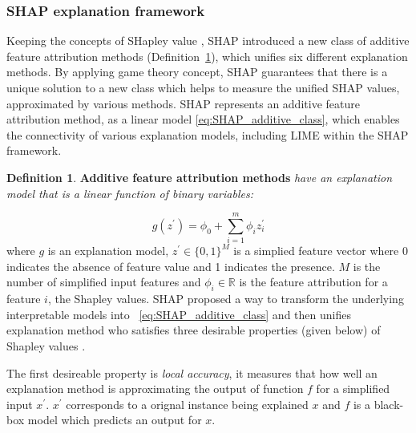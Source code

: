 \documentclass[english]{tktltiki2}
\theoremstyle{definition}
\newtheorem{definition}[thm]{Definition}
\theoremstyle{remark}
\begin{document}
\subsubsection{SHAP explanation framework} %
Keeping the concepts of SHapley value \citep{shapley1953value}, SHAP \citep{lundberg2017unified} introduced a new class of additive feature attribution methods (Definition~\ref{def:SHAP_additive_class}), which unifies six different explanation methods. By applying game theory concept, SHAP guarantees that there is a unique solution to a new class which helps to measure the unified SHAP values, approximated by various methods. SHAP represents an additive feature attribution method, as a linear model \eqref{eq:SHAP_additive_class}, which enables the connectivity of various explanation models, including LIME \citep{ribeiro2016should} within the SHAP framework.

\begin{definition}\label{def:SHAP_additive_class}{\textbf{Additive feature attribution methods} \textit{have an explanation model that is a linear
function of binary variables:}}
\end{definition}

\begin{equation}\label{eq:SHAP_additive_class}
	g(z^\prime) =  \phi_0 + \sum_{i=1}^{m} \phi_i z_i^\prime 
\end{equation}
where $g$ is an explanation model, $z^\prime \in \{0,1\}^{M}$ is a simplied feature vector where 0 indicates the absence of feature value and 1 indicates the presence. $M$ is the number of simplified input features and $\phi_i \in \mathbb{R}$ is the feature attribution for a feature $i$, the Shapley values. SHAP proposed a way to transform the underlying interpretable models into ~\eqref{eq:SHAP_additive_class} and then unifies explanation method who satisfies three desirable properties (given below) of Shapley values \citep{molnarinterpretable}.

The first desireable property is \textit{local accuracy}, it measures that how well an explanation method is approximating the output of function $f$ for a simplified input $x^\prime$. $x^\prime$ corresponds to a orignal instance being explained $x$ and $f$ is a black-box model which predicts an output for $x$.
\end{document}
